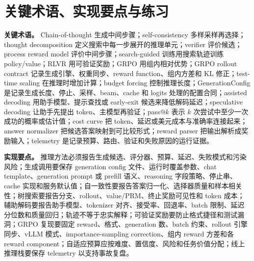 \documentclass[UTF8,zihao=-4,openany]{ctexbook}
\begin{document}
\section{关键术语、实现要点与练习}
\textbf{关键术语。} Chain-of-thought 生成中间步骤；self-consistency 多样采样再选择；thought decomposition 定义搜索中每一步展开的推理单元；verifier 评价候选；process reward model 评价中间步骤；search-guided 训练用搜索轨迹训练 policy/value；RLVR 用可验证奖励；GRPO 用组内相对优势；GRPO rollout contract 记录生成引擎、权重同步、reward function、组内方差和 KL 修正；test-time scaling 在推理时增加计算；budget forcing 控制推理长度；GenerationConfig 是记录生成长度、停止、采样、beam、cache 和 logits 处理的配置合同；assisted decoding 用助手模型、提示查找或 early-exit 候选来降低解码延迟；speculative decoding 让助手先提出 token、主模型再验证；pass@$k$ 表示 $k$ 次尝试中至少一次成功的概率或估计值；cost curve 把 token、延迟或美元成本与准确率连接起来；answer normalizer 把候选答案映射到可比较形式；reward parser 把输出解析成奖励输入；telemetry 是记录预算、路由、验证和失败原因的运行证据。

\textbf{实现要点。} 推理方法必须报告生成候选、评分器、预算、延迟、失败模式和污染风险；生成调用要保存 generation config 文件、运行时覆盖参数、chat template、generation prompt 或 prefill 语义、reasoning 字段策略、停止串、cache 实现和服务默认值；自一致性要报告答案归一化、选择器质量和样本相关性；树搜索要报告分支、rollout、value/PRM、终止奖励可见性和 token 成本；辅助解码要报告助手模型、tokenizer 对齐、接受率、回退率、batch 限制、延迟分位数和质量回归；轨迹不等于忠实解释；可验证奖励要防止格式捷径和测试漏洞；GRPO 复现要固定 reward、格式、generation 数、batch 约束、rollout 引擎同步、vLLM 模式、importance-sampling correction、组内 reward 方差和各 reward component；自适应预算应按难度、置信度、风险和任务价值分配；线上推理栈要保存 telemetry 以支持事故复盘。
\end{document}
